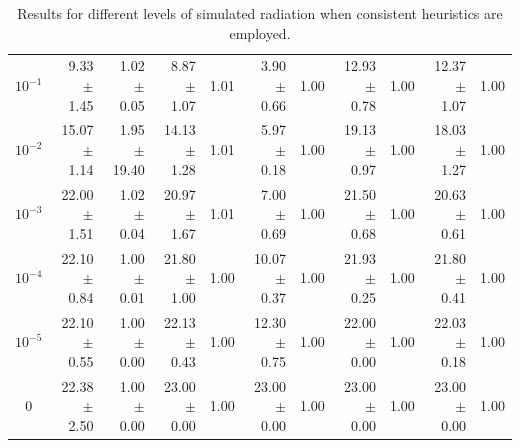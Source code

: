 \documentclass[letterpaper]{article}
\begin{document}
\begin{table}[t]
\begin{tabular}{| c | r  r | r  r | r  r | r  r | r  r |}
$10^{-1}$	& 9.33 $\pm$ 1.45	& 1.02 $\pm$ 0.05	& 8.87 $\pm$ 1.07	& 1.01	& 3.90 $\pm$ 0.66	& 1.00	& 12.93 $\pm$ 0.78	& 1.00	& 12.37 $\pm$ 1.07 & 1.00	\\

$10^{-2}$	& 15.07 $\pm$ 1.14	& 1.95 $\pm$ 19.40	& 14.13 $\pm$ 1.28	& 1.01	& 5.97 $\pm$ 0.18	& 1.00	& 19.13 $\pm$ 0.97	& 1.00	& 18.03 $\pm$ 1.27 & 1.00	\\

$10^{-3}$	& 22.00 $\pm$ 1.51	& 1.02 $\pm$ 0.04	& 20.97 $\pm$ 1.67	& 1.01	& 7.00 $\pm$ 0.69	& 1.00	& 21.50 $\pm$ 0.68	& 1.00	& 20.63 $\pm$ 0.61 & 1.00	\\

$10^{-4}$	& 22.10 $\pm$ 0.84	& 1.00 $\pm$ 0.01	& 21.80 $\pm$ 1.00	& 1.00	& 10.07 $\pm$ 0.37	& 1.00	& 21.93 $\pm$ 0.25	& 1.00	& 21.80 $\pm$ 0.41 & 1.00	\\

$10^{-5}$	& 22.10 $\pm$ 0.55	& 1.00 $\pm$ 0.00	& 22.13 $\pm$ 0.43	& 1.00	& 12.30 $\pm$ 0.75	& 1.00	& 22.00 $\pm$ 0.00	& 1.00	& 22.03 $\pm$ 0.18 & 1.00	\\



0 	& 22.38 $\pm$ 2.50	& 1.00  $\pm$ 0.00 	& 23.00 $\pm$ 0.00 & 1.00  & 23.00 $\pm$ 0.00 & 1.00  & 23.00 $\pm$ 0.00 & 1.00  & 23.00 $\pm$ 0.00 & 1.00 	\\
\hline
\end{tabular}
\caption{Results for different levels of simulated radiation when consistent heuristics are employed.}
\label{tab:results}
\end{table}
\end{document}
